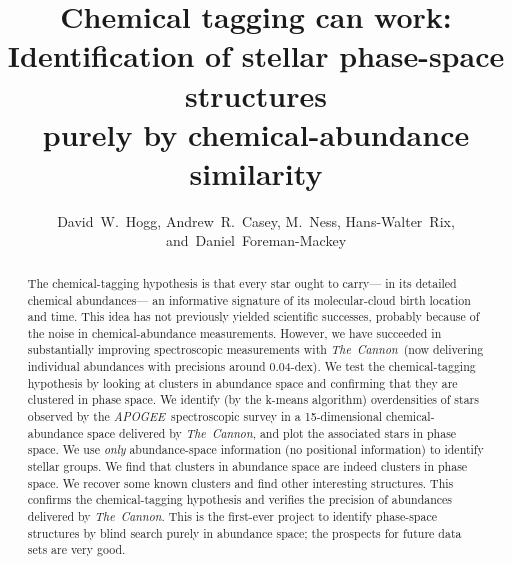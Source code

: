 \documentclass[12pt, letterpaper, preprint]{aastex}
\newcommand{\acronym}[1]{{\small{#1}}}
\newcommand{\project}[1]{\textsl{#1}}
\newcommand{\apogee}{\project{\acronym{APOGEE}}}
\newcommand{\thecannon}{\project{The~Cannon}}
\begin{document}
\sloppy\sloppypar

\title{Chemical tagging can work: \\
       Identification of stellar phase-space structures \\
       purely by chemical-abundance similarity}
\author{David~W.~Hogg,
        Andrew~R.~Casey,
        M.~Ness,
        Hans-Walter~Rix,
    and~Daniel~Foreman-Mackey}

\begin{abstract}
The chemical-tagging hypothesis is that every star ought to carry---%
in its detailed chemical abundances---%
an informative signature of its molecular-cloud birth location and time.
This idea has not previously yielded scientific successes, probably because of the
noise in chemical-abundance measurements.
However, we have succeeded in substantially improving spectroscopic measurements with \thecannon\ 
(now delivering individual abundances with precisions around 0.04-dex).
We test the chemical-tagging hypothesis by looking at clusters in abundance space
and confirming that they are clustered in phase space.
We identify (by the k-means algorithm) overdensities of stars observed by the \apogee\ spectroscopic survey
in a 15-dimensional chemical-abundance space delivered by \thecannon,
and plot the associated stars in phase space.
We use \emph{only} abundance-space information (no positional information) to identify stellar groups.
We find that clusters in abundance space are indeed clusters in phase space.
We recover some known clusters and find other interesting structures.
This confirms the chemical-tagging hypothesis and verifies the precision of abundances delivered by \thecannon.
This is the first-ever project to identify phase-space structures by blind search purely in abundance space;
the prospects for future data sets are very good.
\end{abstract}

\end{document}
